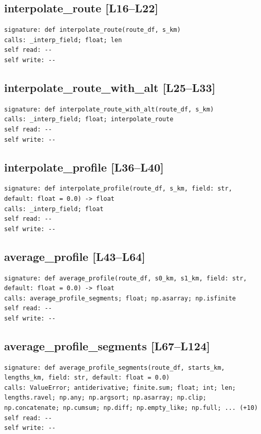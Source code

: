 \documentclass[a4paper,10pt,oneside]{book}
\begin{document}
\subsection*{interpolate\_route [L16--L22]}
\begin{lstlisting}[numbers=none]
signature: def interpolate_route(route_df, s_km)
calls: _interp_field; float; len
self read: --
self write: --
\end{lstlisting}
\subsection*{interpolate\_route\_with\_alt [L25--L33]}
\begin{lstlisting}[numbers=none]
signature: def interpolate_route_with_alt(route_df, s_km)
calls: _interp_field; float; interpolate_route
self read: --
self write: --
\end{lstlisting}
\subsection*{interpolate\_profile [L36--L40]}
\begin{lstlisting}[numbers=none]
signature: def interpolate_profile(route_df, s_km, field: str, default: float = 0.0) -> float
calls: _interp_field; float
self read: --
self write: --
\end{lstlisting}
\subsection*{average\_profile [L43--L64]}
\begin{lstlisting}[numbers=none]
signature: def average_profile(route_df, s0_km, s1_km, field: str, default: float = 0.0) -> float
calls: average_profile_segments; float; np.asarray; np.isfinite
self read: --
self write: --
\end{lstlisting}
\subsection*{average\_profile\_segments [L67--L124]}
\begin{lstlisting}[numbers=none]
signature: def average_profile_segments(route_df, starts_km, lengths_km, field: str, default: float = 0.0)
calls: ValueError; antiderivative; finite.sum; float; int; len; lengths.ravel; np.any; np.argsort; np.asarray; np.clip; np.concatenate; np.cumsum; np.diff; np.empty_like; np.full; ... (+10)
self read: --
self write: --
\end{lstlisting}
\end{document}
